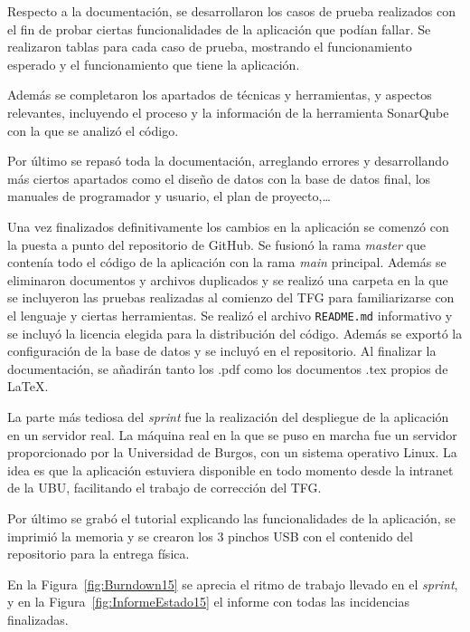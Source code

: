 Respecto a la documentación, se desarrollaron los casos de prueba realizados con el fin de probar ciertas funcionalidades de la aplicación que podían fallar. Se realizaron tablas para cada caso de prueba, mostrando el funcionamiento esperado y el funcionamiento que tiene la aplicación.

Además se completaron los apartados de técnicas y herramientas, y aspectos relevantes, incluyendo el proceso y la información de la herramienta SonarQube con la que se analizó el código.

Por último se repasó toda la documentación, arreglando errores y desarrollando más ciertos apartados como el diseño de datos con la base de datos final, los manuales de programador y usuario, el plan de proyecto,\ldots

Una vez finalizados definitivamente los cambios en la aplicación se comenzó con la puesta a punto del repositorio de GitHub. Se fusionó la rama \textit{master} que contenía todo el código de la aplicación con la rama \textit{main} principal. Además se eliminaron documentos y archivos duplicados y se realizó una carpeta en la que se incluyeron las pruebas realizadas al comienzo del TFG para familiarizarse con el lenguaje y ciertas herramientas. Se realizó el archivo \texttt{README.md} informativo y se incluyó la licencia elegida para la distribución del código. Además se exportó la configuración de la base de datos y se incluyó en el repositorio. Al finalizar la documentación, se añadirán tanto los .pdf como los documentos .tex propios de \LaTeX{}.


La parte más tediosa del \textit{sprint} fue la realización del despliegue de la aplicación en un servidor real.
La máquina real en la que se puso en marcha fue un servidor proporcionado por la Universidad de Burgos, con un sistema operativo Linux. La idea es que la aplicación estuviera disponible en todo momento desde la intranet de la UBU, facilitando el trabajo de corrección del TFG.


Por último se grabó el tutorial explicando las funcionalidades de la aplicación, se imprimió la memoria y se crearon los 3 pinchos USB con el contenido del repositorio para la entrega física.

En la Figura~\ref{fig:Burndown15} se aprecia el ritmo de trabajo llevado en el \textit{sprint}, y en la Figura~\ref{fig:InformeEstado15} el informe con todas las incidencias finalizadas.



